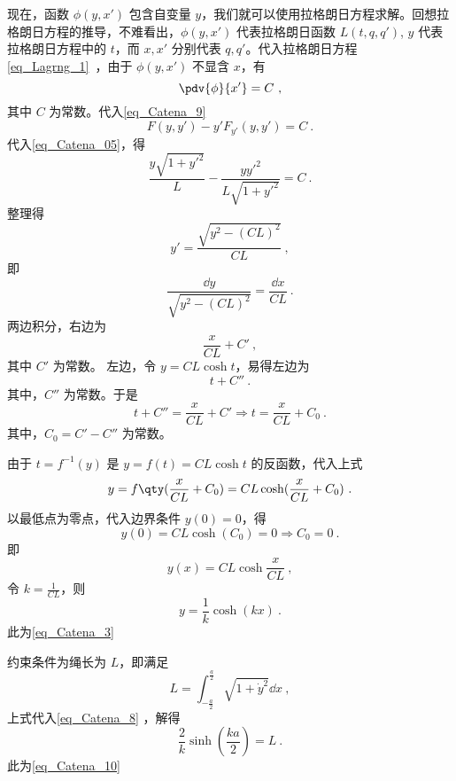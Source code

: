 现在，函数 $\phi(y,x')$ 包含自变量 $y$，我们就可以使用拉格朗日方程求解。回想拉格朗日方程的推导，不难看出，$\phi(y,x')$ 代表拉格朗日函数 $L(t,q,q')$, $y$ 代表拉格朗日方程中的 $t$，而 $x,x'$ 分别代表 $q,q'$。代入拉格朗日方程\autoref{eq_Lagrng_1}~，由于 $\phi(y,x')$ 不显含 $x$，有
\begin{equation}
\pdv{\phi}{x'}=C~,
\end{equation}
其中 $C$ 为常数。代入\autoref{eq_Catena_9} 
\begin{equation}
F(y,y')-y'F_{y'}(y,y')=C~.
\end{equation}
代入\autoref{eq_Catena_05}，得
\begin{equation}
\frac{y\sqrt{1+y'^2}}{L}-\frac{yy'^2}{L\sqrt{1+y'^2}}=C~.
\end{equation}
整理得
\begin{equation}
y'=\frac{\sqrt{y^2-(CL)^2}}{CL}~,
\end{equation}
即
\begin{equation}
\frac{\dd y}{\sqrt{y^2-(CL)^2}}=\frac{\dd x}{CL}~.
\end{equation}
两边积分，右边为
\begin{equation}
\frac{x}{CL}+C'~,
\end{equation}
其中 $C'$ 为常数。
左边，令 $y=CL\cosh t $，易得左边为
\begin{equation}
t+C''~.
\end{equation}
其中，$C''$ 为常数。于是
\begin{equation}
t+C''=\frac{x}{CL}+C'\Rightarrow t=\frac{x}{CL}+C_0~.
\end{equation}
其中，$C_0=C'-C''$ 为常数。

由于 $t=f^{-1}(y)$ 是 $y=f(t)=CL\cosh t$ 的反函数，代入上式
\begin{equation}\label{eq_Catena_13}
y=f\qty(\frac{x}{CL}+C_0)=CL\cosh (\frac{x}{CL}+C_0)~.
\end{equation}
以最低点为零点，代入边界条件 $y(0)=0$，得
\begin{equation}
y(0)=CL\cosh (C_0)=0\Rightarrow C_0=0~.
\end{equation}
即
\begin{equation}
y(x)=CL \cosh \frac{x}{CL}~,
\end{equation}
令 $k=\frac{1}{CL}$，则
\begin{equation}\label{eq_Catena_8}
y=\frac{1}{k}\cosh (kx)~.
\end{equation}
此为\autoref{eq_Catena_3} 

约束条件为绳长为 $L$，即满足
\begin{equation}
L = \int_{-\frac{a}{2}}^{\frac{a}{2}} \sqrt{1 + \dot y^2} \dd{x}~,
\end{equation}
上式代入\autoref{eq_Catena_8} ，解得
\begin{equation}
\frac{2}{k}\sinh(\frac{ka}{2}) = L~.
\end{equation}
此为\autoref{eq_Catena_10} 
